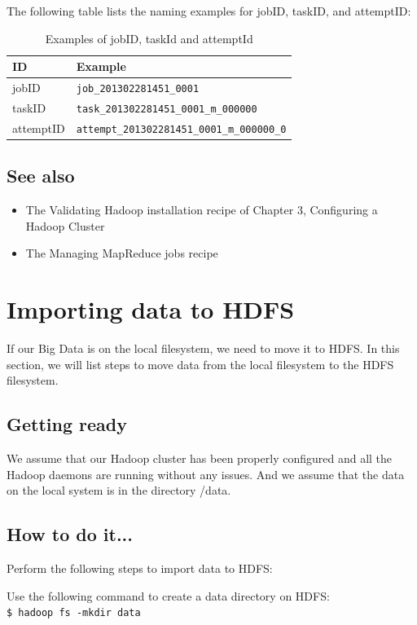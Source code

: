 The following table lists the naming examples for jobID, taskID, and attemptID:
\begin{table}
  \centering
  \begin{tabular}{ll}
    \toprule 
    \textbf{ID} & \textbf{Example} \\ \midrule
    jobID & \verb|job_201302281451_0001| \\ 
    taskID & \verb|task_201302281451_0001_m_000000| \\
    attemptID & \verb|attempt_201302281451_0001_m_000000_0| \\ \bottomrule
  \end{tabular}
  \caption{Examples of jobID, taskId and attemptId}\label{tbl:ids}
\end{table}

\subsection*{See also}
\begin{itemize}
  \item The Validating Hadoop installation recipe of Chapter 3, Configuring a Hadoop Cluster
  \item The Managing MapReduce jobs recipe
\end{itemize}


\section{Importing data to HDFS}
If our Big Data is on the local filesystem, we need to move it to HDFS. In this section, we will list steps to move data from the local filesystem to the HDFS filesystem.

\subsection*{Getting ready}
We assume that our Hadoop cluster has been properly configured and all the Hadoop daemons are running without any issues. And we assume that the data on the local system is in the directory /data.
\subsection*{How to do it...}
Perform the following steps to import data to HDFS: 

Use the following command to create a data directory on HDFS: \\
\verb|$ hadoop fs -mkdir data|


